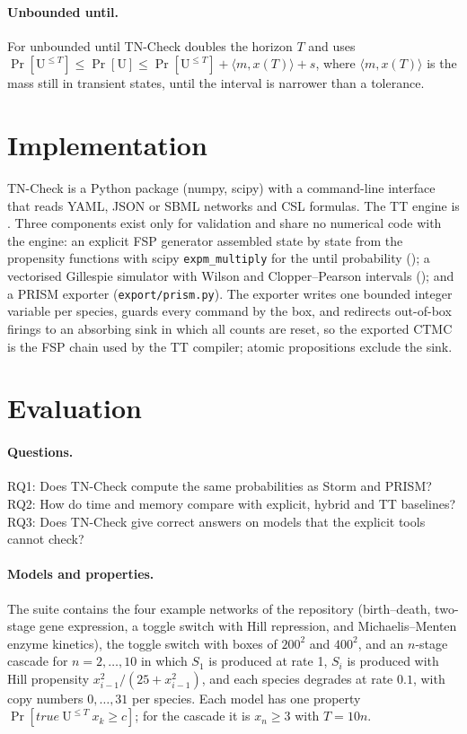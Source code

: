 \documentclass[11pt]{article}
\begin{document}
\paragraph{Unbounded until.} For unbounded until TN-Check doubles the horizon $T$ and
uses $\Pr[\mathrm{U}^{\le T}]\le\Pr[\mathrm{U}]\le\Pr[\mathrm{U}^{\le T}]+\langle m,x(T)\rangle+s$,
where $\langle m,x(T)\rangle$ is the mass still in transient states, until the interval
is narrower than a tolerance.

\section{Implementation}\label{sec:impl}

TN-Check is a Python package (numpy, scipy) with a command-line interface that reads
YAML, JSON or SBML networks and CSL formulas. The TT engine is
. Three components exist only for
validation and share no numerical code with the engine:
an explicit FSP generator assembled state by state from the propensity functions
with scipy \texttt{expm\_multiply} for the until probability
(); a vectorised Gillespie simulator with Wilson and
Clopper--Pearson intervals \cite{wilson1927} (); and a PRISM
exporter (\texttt{export/prism.py}). The exporter writes one bounded integer variable
per species, guards every command by the box, and redirects out-of-box firings to an
absorbing sink in which all counts are reset, so the exported CTMC is the FSP chain
used by the TT compiler; atomic propositions exclude the sink.

\section{Evaluation}\label{sec:eval}

\paragraph{Questions.}
RQ1: Does TN-Check compute the same probabilities as Storm and PRISM?
RQ2: How do time and memory compare with explicit, hybrid and TT baselines?
RQ3: Does TN-Check give correct answers on models that the explicit tools cannot check?

\paragraph{Models and properties.} The suite contains the four example networks of the
repository (birth--death, two-stage gene expression, a toggle switch with Hill
repression, and Michaelis--Menten enzyme kinetics), the toggle switch with boxes of
$200^2$ and $400^2$, and an $n$-stage cascade for $n=2,\dots,10$ in which $S_1$ is
produced at rate 1, $S_i$ is produced with Hill propensity $x_{i-1}^2/(25+x_{i-1}^2)$,
and each species degrades at rate $0.1$, with copy numbers $0,\dots,31$ per species.
Each model has one property $\Pr[\mathit{true}\ \mathrm{U}^{\le T}\ x_k\ge c]$; for the
cascade it is $x_n\ge3$ with $T=10n$.
\end{document}
